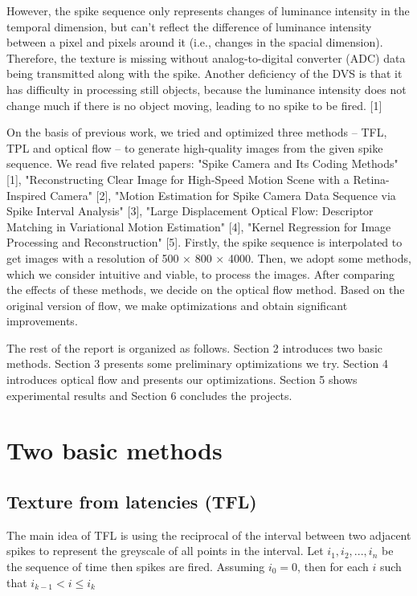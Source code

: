 \documentclass[10pt,twocolumn,letterpaper]{article}
\begin{document}
However, the spike sequence only represents changes of luminance intensity in the temporal dimension, but can't reflect the difference of luminance intensity between a pixel and pixels around it (i.e., changes in the spacial dimension). Therefore, the texture is missing without analog-to-digital converter (ADC) data being transmitted along with the spike. Another deficiency of the DVS is that it has difficulty in processing still objects, because the luminance intensity does not change much if there is no object moving, leading to no spike to be fired. [1]

On the basis of previous work, we tried and optimized three methods -- TFL, TPL and optical flow -- to generate high-quality images from the given spike sequence. We read five related papers: "Spike Camera and Its Coding Methods" [1], "Reconstructing Clear Image for High-Speed Motion Scene with a Retina-Inspired Camera" [2], "Motion Estimation for Spike Camera Data Sequence via Spike Interval Analysis" [3], "Large Displacement Optical Flow: Descriptor Matching in Variational Motion Estimation" [4], "Kernel Regression for Image Processing and Reconstruction" [5]. Firstly, the spike sequence is interpolated to get images with a resolution of 500 × 800 × 4000. Then, we adopt some methods, which we consider intuitive and viable, to process the images. After comparing the effects of these methods, we decide on the optical flow method. Based on the original version of flow, we make optimizations and obtain significant improvements.

The rest of the report is organized as follows. Section 2 introduces two basic methods. Section 3 presents some preliminary optimizations we try. Section 4 introduces optical flow and presents our optimizations. Section 5 shows experimental results and Section 6 concludes the projects.

\section{Two basic methods}

\subsection{Texture from latencies (TFL)}

The main idea of TFL is using the reciprocal of the interval between two adjacent spikes to represent the greyscale of all points in the interval. Let $i_1, i_2, ..., i_n$ be the sequence of time then spikes are fired. Assuming $i_0 = 0$, then for each $i$ such that $i_{k-1} < i \leqslant i_k$
\end{document}
